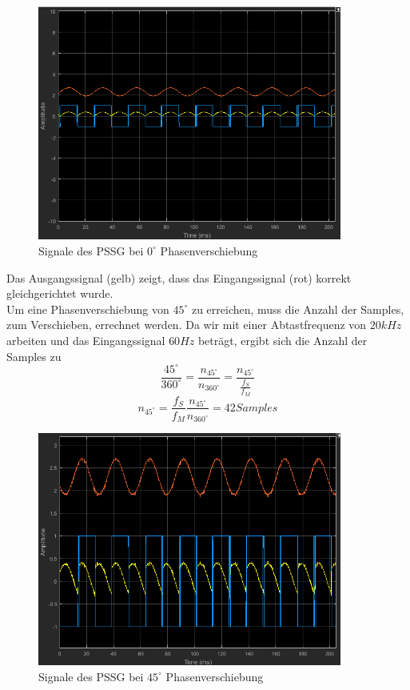 \documentclass[a4paper,12pt]{article}
\begin{document}
	\begin{figure}[h]
		\centering
		\includegraphics[width=10cm]{assets/pssg-phase0}
		\caption{Signale des PSSG bei $0^{\circ}$ Phasenverschiebung}
	\end{figure}\newline
	Das Ausgangssignal (gelb) zeigt, dass das Eingangssignal (rot) korrekt gleichgerichtet wurde.\\ \newline
	Um eine Phasenverschiebung von $45^{\circ}$ zu erreichen, muss die Anzahl der Samples, zum Verschieben, errechnet werden.\newline
	Da wir mit einer Abtastfrequenz von $20kHz$ arbeiten und das Eingangssignal $60Hz$ beträgt, ergibt sich die Anzahl der Samples zu \[
		\frac{45^{\circ}}{360^{\circ}}=\frac{n_{45^{\circ}}}{n_{360^{\circ}}}=\frac{n_{45^{\circ}}}{\frac{f_S}{f_M}}
	\]
	\[
		n_{45^{\circ}}=\frac{f_S}{f_M}\frac{n_{45^{\circ}}}{n_{360^{\circ}}}=42 Samples
	\]
	\begin{figure}[H]
		\centering
		\includegraphics[width=10cm]{assets/pssg-phase45}
		\caption{Signale des PSSG bei $45^{\circ}$ Phasenverschiebung}
	\end{figure}
\end{document}
